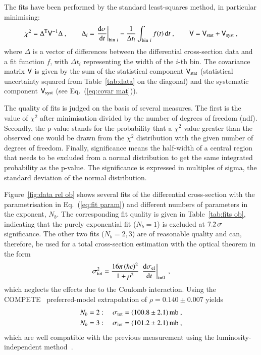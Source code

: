 The fits have been performed by the standard least-squares method, in particular minimising:
\begin{equation}
\label{eq:chi sq}
	\chi^2 = \Delta^{\rm T} \mathsf{V}^{-1} \Delta\ ,\qquad
	\Delta_i = \left.{{\rm d}\sigma\over {\rm d} t}\right|_{{\rm bin}\ i} - {1\over \Delta t_i} \int_{{\rm bin}\ i} f(t)\,{\rm d} t\ ,\qquad
	\mathsf{V} = \mathsf{V}_{\rm stat} + \mathsf{V}_{\rm syst}\ ,
\end{equation}
where $\Delta$ is a vector of differences between the differential cross-section data and a fit function $f$, with $\Delta t_i$ representing the width of the $i$-th bin. The covariance matrix $\mathsf{V}$ is given by the sum of the statistical component $\mathsf{V}_{\rm stat}$ (statistical uncertainty squared from Table~\ref{tab:data} on the diagonal) and the systematic component $\mathsf{V}_{\rm syst}$ (see Eq.~(\ref{eq:covar mat})).

The quality of fits is judged on the basis of several measures. The first is the value of $\chi^2$ after minimisation divided by the number of degrees of freedom (ndf). Secondly, the p-value stands for the probability that a $\chi^2$ value greater than the observed one would be drawn from the $\chi^2$ distribution with the given number of degrees of freedom. Finally, significance means the half-width of a central region that needs to be excluded from a normal distribution to get the same integrated probability as the p-value. The significance is expressed in multiples of sigma, the standard deviation of the normal distribution.

Figure~\ref{fig:data rel ob} shows several fits of the differential cross-section with the parametrisation in Eq.~(\ref{eq:fit param}) and different numbers of parameters in the exponent, $N_b$. The corresponding fit quality is given in Table~\ref{tab:fits ob}, indicating that the purely exponential fit ($N_b = 1$) is excluded at $7.2\,{\rm \sigma}$ significance.
%
The other two fits ($N_b = 2, 3$) are of reasonable quality and can, therefore, be used for a total cross-section estimation with the optical theorem in the form
\begin{equation}
\label{eq:si tot}
\sigma_{\rm tot}^2 = {16\pi\, (\hbar c)^2\over 1 + \rho^2}\, \left. {\rm d}\sigma_{\rm el}\over{\rm d} t\right|_{t=0}\ ,
\end{equation}
which neglects the effects due to the Coulomb interaction.
Using the COMPETE~\cite{compete} preferred-model extrapolation of $\rho = 0.140\pm 0.007$ yields
\begin{equation}
\label{eq:si tot results}
	\begin{aligned}
		N_b &= 2:\quad \sigma_{\rm tot} = (100.8 \pm 2.1)\un{mb}\ ,\\
		N_b &= 3:\quad \sigma_{\rm tot} = (101.2 \pm 2.1)\un{mb}\ ,\\
	\end{aligned}
\end{equation}
which are well compatible with the previous measurement using the luminosity-independent \linebreak method~\cite{prl111}.

